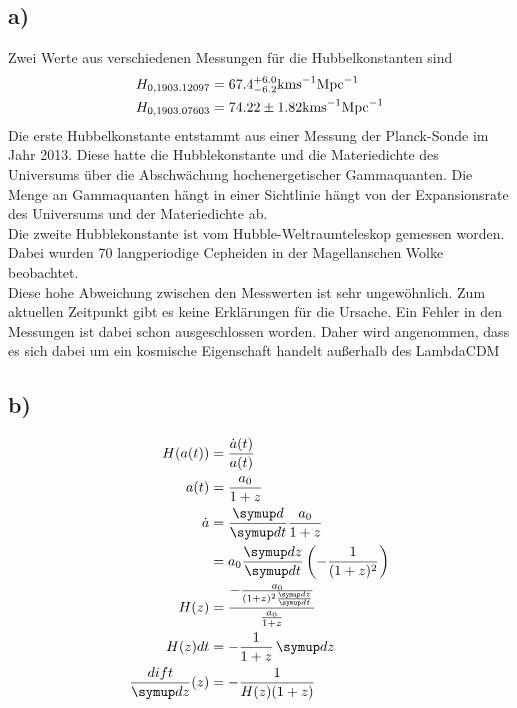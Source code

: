     \subsection{a)}
    Zwei Werte aus verschiedenen Messungen für die Hubbelkonstanten sind
    \begin{align}
        H_{0,1903.12097} &= 67.4^{+6.0}_{\--6.2} \si{\kilo\meter\second\tothe{-1}\mega pc \tothe{-1}}\\
        H_{0,1903.07603} &= 74.22\pm1.82 \si{\kilo\meter\second\tothe{-1}\mega pc \tothe{-1}}
    \end{align}
    Die erste Hubbelkonstante entstammt aus einer Messung der Planck-Sonde im Jahr 2013. Diese
    hatte die Hubblekonstante und die Materiedichte des Universums über die Abschwächung hochenergetischer
    Gammaquanten. Die Menge an Gammaquanten hängt in einer Sichtlinie hängt von der Expansionsrate des
    Universums und der Materiedichte ab.\\
    Die zweite Hubblekonstante ist vom Hubble-Weltraumteleskop gemessen worden. Dabei wurden 70 langperiodige
    Cepheiden in der Magellanschen Wolke beobachtet.\\
    Diese hohe Abweichung zwischen den Messwerten ist sehr ungewöhnlich. Zum aktuellen Zeitpunkt gibt
    es keine Erklärungen für die Ursache. Ein Fehler in den Messungen ist dabei schon ausgeschlossen worden.
    Daher wird angenommen, dass es sich dabei um ein kosmische Eigenschaft handelt außerhalb des LambdaCDM
    \subsection{b)}
    \begin{align}
        H(a(t)) &= \frac{\dot{a}(t)}{a(t)}\\
        a(t) &= \frac{a_0}{1+z}\\
        \dot{a} &= \frac{\dif{}}{\dif{t}} \frac{a_0}{1+z}\\
        &= a_0 \frac{\dif{z} }{\dif{t}} \left(-\frac{1}{(1+z)^2} \right)\\
        H(z) &= \frac{-\frac{a_0}{(1+z)^2 \frac{\dif{z}}{\dif{t}}}}{\frac{a_0}{1+z}}\\
        H(z) dt &= -\frac{1}{1+z} \dif{z}\\
        \frac{dif{t}}{\dif{z}}(z)&= -\frac{1}{H(z)(1+z)}
    \end{align}

